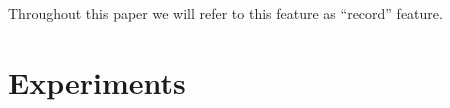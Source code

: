 Throughout this paper we will refer to this feature as ``record'' feature.





\section{Experiments}\label{sec:exp}


